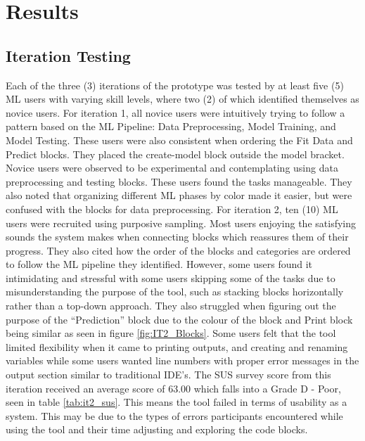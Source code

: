 \documentclass{sigchi-ext}
\begin{document}
\section{Results}

\subsection{Iteration Testing}
Each of the three (3) iterations of the prototype was tested by at least five (5) ML users with varying skill levels, where two (2) of which identified themselves as novice users. For iteration 1, all novice users were intuitively trying to follow a pattern based on the ML Pipeline: Data Preprocessing, Model Training, and Model Testing. These users were also consistent when ordering the Fit Data and Predict blocks. They placed the create-model block outside the model bracket. Novice users were observed to be experimental and contemplating using data preprocessing and testing blocks. These users found the tasks manageable. They also noted that organizing different ML phases by color made it easier, but were confused with the blocks for data preprocessing. For iteration 2, ten (10) ML users were recruited using purposive sampling. Most users enjoying the satisfying sounds the system makes when connecting blocks which reassures them of their progress. They also cited how the order of the blocks and categories are ordered to follow the ML pipeline they identified. However, some users found it intimidating and stressful with some users skipping some of the tasks due to misunderstanding the purpose of the tool, such as stacking blocks horizontally rather than a top-down approach. They also struggled when figuring out the purpose of the ``Prediction'' block due to the colour of the block and Print block being similar as seen in figure \ref{fig:IT2_Blocks}. Some users felt that the tool limited flexibility when it came to printing outputs, and creating and renaming variables while some users wanted line numbers with proper error messages in the output section similar to traditional IDE's. The SUS survey score from this iteration received an average score of 63.00 which falls into a Grade D - Poor, seen in table \ref{tab:it2_sus}. This means the tool failed in terms of usability as a system. This may be due to the types of errors participants encountered while using the tool and their time adjusting and exploring the code blocks. 
\end{document}
